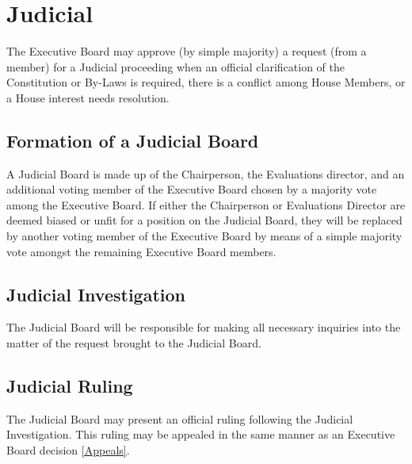 \documentclass{article}
\newcommand{\article}[1]{\section{#1} \label{#1}}
\newcommand{\asection}[1]{\subsection{#1} \label{#1}}
\begin{document}
\article{Judicial}
The Executive Board may approve (by simple majority) a request (from a member) for a Judicial proceeding when an official clarification of the Constitution or By-Laws is required, there is a conflict among House Members, or a House interest needs resolution.
\asection{Formation of a Judicial Board}
A Judicial Board is made up of the Chairperson, the Evaluations director, and an additional voting member of the Executive Board chosen by a majority vote among the Executive Board.
If either the Chairperson or Evaluations Director are deemed biased or unfit for a position on the Judicial Board, they will be replaced by another voting member of the Executive Board by means of a simple majority vote amongst the remaining Executive Board members.
\asection{Judicial Investigation}
The Judicial Board will be responsible for making all necessary inquiries into the matter of the request brought to the Judicial Board.
\asection{Judicial Ruling}
The Judicial Board may present an official ruling following the Judicial Investigation.
This ruling may be appealed in the same manner as an Executive Board decision \ref{Appeals}.
\end{document}
